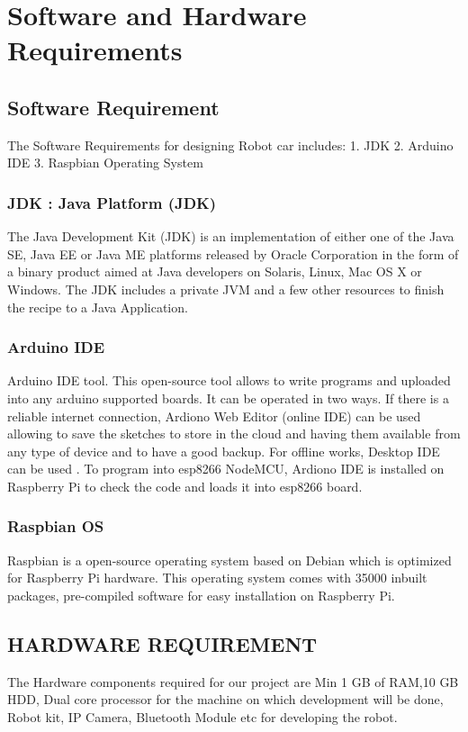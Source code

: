 \documentclass[sigconf]{acmart}
\begin{document}
\section{Software and Hardware Requirements}

\subsection{Software Requirement}
The Software Requirements for designing Robot car includes:
1. JDK
2. Arduino IDE
3. Raspbian Operating System

\subsubsection{JDK : Java Platform (JDK)}
The Java Development Kit (JDK) is an implementation
of either one of the Java SE, Java EE or Java ME platforms released by Oracle Corporation in the form of a binary product aimed at Java developers on Solaris, Linux, Mac OS X or Windows. The JDK includes a private JVM and a few other resources to finish the recipe to a Java Application.

\subsubsection{Arduino IDE}
Arduino IDE tool. This open-source tool allows to write programs and uploaded into any arduino supported boards. It can be operated in two ways. If there is a reliable internet connection, Ardiono Web Editor (online IDE) can be used allowing to save the sketches to store in the cloud and having them available from any type of device and to have a good backup. For offline works, Desktop IDE can be used \cite{arduino2015}. To program into esp8266 NodeMCU, Ardiono IDE is installed on Raspberry Pi to check the code and loads it into esp8266 board.

\subsubsection{Raspbian OS}
Raspbian is a open-source operating system based on Debian which is optimized for Raspberry Pi hardware. This operating system comes with 35000 inbuilt packages, pre-compiled software for easy installation on Raspberry Pi.

\subsection{HARDWARE REQUIREMENT}
The Hardware components required for our project are Min 1 GB of RAM,10 GB HDD, Dual core processor for the machine on which development will be done, Robot kit, IP Camera, Bluetooth Module etc for developing the robot.
\end{document}
